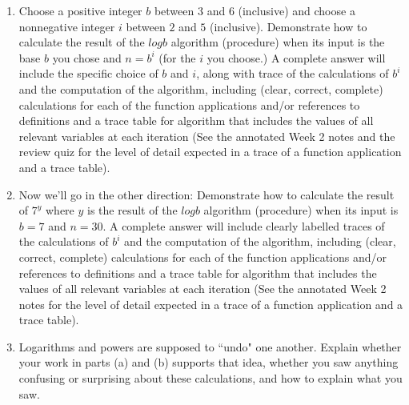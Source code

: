 \begin{enumerate}[labelindent=0pt, leftmargin=0pt]
    \begin{enumerate}
    \item Choose a positive integer $b$ between $3$ and $6$ (inclusive) and choose a 
    nonnegative integer $i$ between $2$ and $5$ (inclusive). Demonstrate how to calculate 
    the result of the $logb$ algorithm (procedure) when its input is the base $b$ you chose and
    $n = b^i$ (for the $i$ you choose.) 
    A complete answer will include the specific choice of $b$ and $i$, along with 
    trace of the calculations of $b^i$ and the computation of the algorithm, including 
    (clear, correct, complete) calculations for each of the function applications 
    and/or references to definitions and a trace table for algorithm that includes the values of all relevant 
    variables at each iteration (See the annotated Week 2 notes and the review quiz for the level of detail expected
    in a trace of a function application and a trace table).
    \item Now we'll go in the other direction: Demonstrate how to calculate the result of 
    $7^y$ where $y$ is the result of the $logb$ algorithm (procedure) when its input is $b=7$ and $n=30$.
    A complete answer will include clearly labelled 
    traces of the calculations of $b^i$ and the computation of the algorithm, including 
    (clear, correct, complete) calculations for each of the function applications 
    and/or references to definitions and a trace table for algorithm that includes the values of all relevant 
    variables at each iteration (See the annotated Week 2 notes for the level of detail expected
    in a trace of a function application and a trace table).    
    \item Logarithms and powers are supposed to ``undo" one another. Explain whether your work in parts (a) and (b)
    supports that idea,  whether you saw anything confusing or surprising about these calculations, and how to explain what you saw.
    \end{enumerate}


\end{enumerate}
